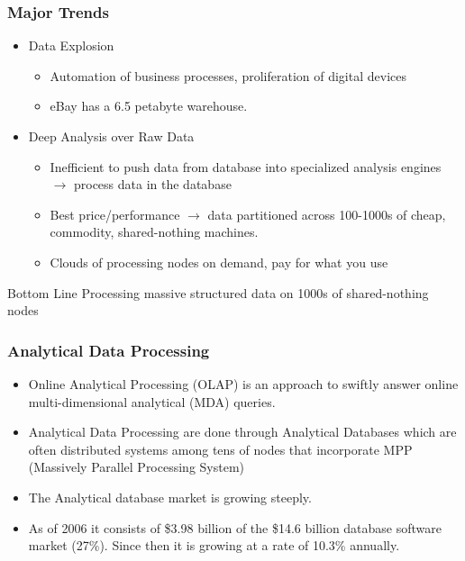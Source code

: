 \documentclass{beamer}
\begin{document}
\begin{frame}
  \frametitle{Major Trends}
  \begin{itemize}
  \item Data Explosion
    \begin{itemize}
    \item Automation of business processes, proliferation of digital
      devices
    \item eBay has a 6.5 petabyte warehouse.
    \end{itemize}
   \item Deep Analysis over Raw Data
     \begin{itemize}
     \item Inefficient to push data from database into specialized analysis
       engines $\rightarrow$ process data in the database
     \item Best price/performance $\rightarrow$ data partitioned across 100-1000s
       of cheap, commodity, shared-nothing machines.
     \item Clouds of processing nodes on demand, pay for what you use
    \end{itemize}
  \end{itemize}
  \begin{block}{Bottom Line}
    Processing massive structured data on 1000s of shared-nothing
    nodes
  \end{block}
\end{frame}

\begin{frame}
  \frametitle{Analytical Data Processing}
  \begin{itemize}
  \item Online Analytical Processing (OLAP) is an approach to swiftly
    answer online multi-dimensional analytical (MDA)
    queries. %
  \item Analytical Data Processing are done through Analytical Databases
    which are often distributed systems among tens of nodes that
    incorporate MPP (Massively Parallel Processing System)
  \item The Analytical database market is growing steeply.
  \item As of 2006 it consists of \$3.98 billion of the \$14.6 billion
    database software market (27\%). Since then it is growing at a rate of 10.3\% annually.
  \end{itemize}
\end{frame}
\end{document}
